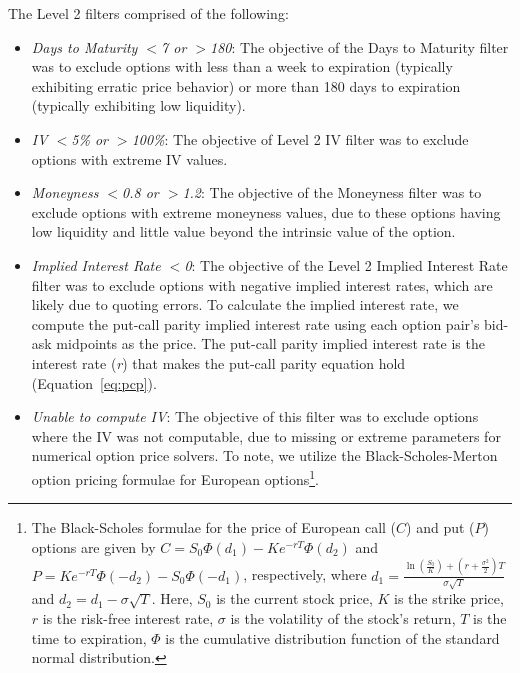 The Level 2 filters comprised of the following: 
\begin{itemize}
  \item \textit{Days to Maturity $<$7 or $>$180}: The objective of the Days to Maturity filter was to exclude options with less than a week to expiration (typically exhibiting erratic price behavior) or more than 180 days to expiration (typically exhibiting low liquidity).
  \item \textit{IV $<$5\% or $>$100\%}: The objective of Level 2 IV filter was to exclude options with extreme IV values.
  \item \textit{Moneyness $<$0.8 or $>$1.2}: The objective of the Moneyness filter was to exclude options with extreme moneyness values, due to these options having low liquidity and little value beyond the intrinsic value of the option.
  \item \textit{Implied Interest Rate $<$0}: The objective of the Level 2 Implied Interest Rate filter was to exclude options with negative implied interest rates, which are likely due to quoting errors. To calculate the implied interest rate, we compute the put-call parity implied interest rate using each option pair's bid-ask midpoints as the price. The put-call parity implied interest rate is the interest rate (\textit{r}) that makes the put-call parity equation hold (Equation~\ref{eq:pcp}).
  \item \textit{Unable to compute IV}: The objective of this filter was to exclude options where the IV was not computable, due to missing or extreme parameters for numerical option price solvers. To note, we utilize the Black-Scholes-Merton option pricing formulae for European options\footnote{The Black-Scholes formulae for the price of European call ($C$) and put ($P$) options are given by $C = S_0 \Phi(d_1) - K e^{-rT} \Phi(d_2)$ and $P = K e^{-rT} \Phi(-d_2) - S_0 \Phi(-d_1)$, respectively, where $d_1 = \frac{\ln(\frac{S_0}{K}) + (r + \frac{\sigma^2}{2})T}{\sigma\sqrt{T}}$ and $d_2 = d_1 - \sigma\sqrt{T}$. Here, $S_0$ is the current stock price, $K$ is the strike price, $r$ is the risk-free interest rate, $\sigma$ is the volatility of the stock's return, $T$ is the time to expiration, $\Phi$ is the cumulative distribution function of the standard normal distribution.
  }.
\end{itemize}


